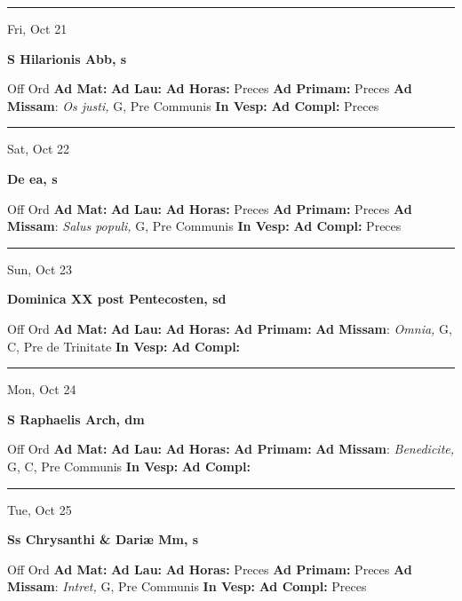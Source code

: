 \documentclass[letterpaper, 10pt]{article}
\begin{document}
\hrule
\begin{center}
Fri, Oct 21
\end{center}\textbf{ \large S Hilarionis Abb, \textnormal{\normalsize s}}
\begin{justify}
Off Ord
\textbf{Ad Mat: }
\textbf{Ad Lau: }
\textbf{Ad Horas: }Preces
\textbf{Ad Primam: }Preces
\textbf{Ad Missam}: \textit{Os justi,} G, Pre Communis
\textbf{In Vesp: }
\textbf{Ad Compl: }Preces\end{justify}



\hrule
\begin{center}
Sat, Oct 22
\end{center}\textbf{ \large De ea, \textnormal{\normalsize s}}
\begin{justify}
Off Ord
\textbf{Ad Mat: }
\textbf{Ad Lau: }
\textbf{Ad Horas: }Preces
\textbf{Ad Primam: }Preces
\textbf{Ad Missam}: \textit{Salus populi,} G, Pre Communis
\textbf{In Vesp: }
\textbf{Ad Compl: }Preces\end{justify}



\hrule
\begin{center}
Sun, Oct 23
\end{center}\textbf{ \large Dominica XX post Pentecosten, \textnormal{\normalsize sd}}
\begin{justify}
Off Ord
\textbf{Ad Mat: }
\textbf{Ad Lau: }
\textbf{Ad Horas: }
\textbf{Ad Primam: }
\textbf{Ad Missam}: \textit{Omnia,} G, C, Pre de Trinitate
\textbf{In Vesp: }
\textbf{Ad Compl: }\end{justify}



\hrule
\begin{center}
Mon, Oct 24
\end{center}\textbf{ \large S Raphaelis Arch, \textnormal{\normalsize dm}}
\begin{justify}
Off Ord
\textbf{Ad Mat: }
\textbf{Ad Lau: }
\textbf{Ad Horas: }
\textbf{Ad Primam: }
\textbf{Ad Missam}: \textit{Benedicite,} G, C, Pre Communis
\textbf{In Vesp: }
\textbf{Ad Compl: }\end{justify}



\hrule
\begin{center}
Tue, Oct 25
\end{center}\textbf{ \large Ss Chrysanthi \& Dariæ Mm, \textnormal{\normalsize s}}
\begin{justify}
Off Ord
\textbf{Ad Mat: }
\textbf{Ad Lau: }
\textbf{Ad Horas: }Preces
\textbf{Ad Primam: }Preces
\textbf{Ad Missam}: \textit{Intret,} G, Pre Communis
\textbf{In Vesp: }
\textbf{Ad Compl: }Preces\end{justify}
\end{document}

